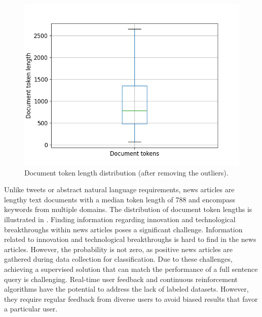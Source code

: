 \begin{figure}[h]
	\centering
	\includegraphics[width=.65\textwidth]{images/keynotes_images/token_length_boxplot.png}
	\caption[Document length distribution.]{Document token length distribution (after removing the outliers). \label{fig:token_length_distribution}}
\end{figure}

Unlike tweets or abstract natural language requirements, news articles are lengthy text documents with a median token length of 788 and encompass keywords from multiple domains. The distribution of document token lengths is illustrated in . Finding information regarding innovation and technological breakthroughs within news articles poses a significant challenge. Information related to innovation and technological breakthroughs is hard to find in the news articles. However, the probability is not zero, as positive news articles are gathered during data collection for classification. Due to these challenges, achieving a supervised solution that can match the performance of a full sentence query is challenging. Real-time user feedback and continuous reinforcement algorithms have the potential to address the lack of labeled datasets. However, they require regular feedback from diverse users to avoid biased results that favor a particular user.




